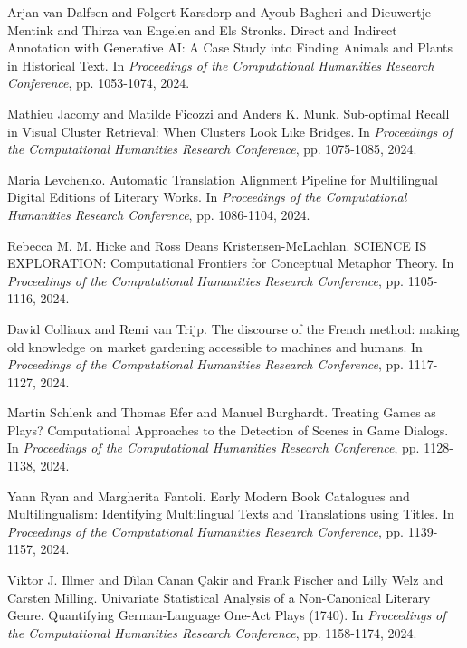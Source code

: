 \begin{thebibliography}{99}
 Arjan van Dalfsen and Folgert Karsdorp and Ayoub Bagheri and Dieuwertje Mentink and Thirza van Engelen and Els Stronks. {D}irect and {I}ndirect {A}nnotation with {G}enerative {A}I: {A} Case {S}tudy into {F}inding {A}nimals and {P}lants in {H}istorical {T}ext. In \textit{Proceedings of the Computational Humanities Research Conference}, pp. 1053-1074, 2024.

 Mathieu Jacomy and Matilde Ficozzi and Anders K. Munk. {S}ub-optimal {R}ecall in {V}isual {C}luster {R}etrieval: {W}hen {C}lusters {L}ook {L}ike {B}ridges. In \textit{Proceedings of the Computational Humanities Research Conference}, pp. 1075-1085, 2024.

 Maria Levchenko. {A}utomatic {T}ranslation {A}lignment {P}ipeline for {M}ultilingual {D}igital {E}ditions of {L}iterary {W}orks. In \textit{Proceedings of the Computational Humanities Research Conference}, pp. 1086-1104, 2024.

 Rebecca M. M. Hicke and Ross Deans Kristensen-McLachlan. S{C}IE{N}CE {I}S {E}XP{L}OR{A}TI{O}N: {C}omputational {F}rontiers for {C}onceptual {M}etaphor {T}heory. In \textit{Proceedings of the Computational Humanities Research Conference}, pp. 1105-1116, 2024.

 David Colliaux and Remi van Trijp. {T}he discourse of the {F}rench method: making old knowledge on market gardening accessible to machines and humans. In \textit{Proceedings of the Computational Humanities Research Conference}, pp. 1117-1127, 2024.

 Martin Schlenk and Thomas Efer and Manuel Burghardt. {T}reating {G}ames as {P}lays? {C}omputational {A}pproaches to the {D}etection of {S}cenes in {G}ame {D}ialogs. In \textit{Proceedings of the Computational Humanities Research Conference}, pp. 1128-1138, 2024.

 Yann Ryan and Margherita Fantoli. {E}arly {M}odern {B}ook {C}atalogues and {M}ultilingualism: {I}dentifying {M}ultilingual {T}exts and {T}ranslations using {T}itles. In \textit{Proceedings of the Computational Humanities Research Conference}, pp. 1139-1157, 2024.

 Viktor J. Illmer and D{\^\i}lan Canan {\c C}akir and Frank Fischer and Lilly Welz and Carsten Milling. {U}nivariate {S}tatistical {A}nalysis of a {N}on-{C}anonical {L}iterary {G}enre. {Q}uantifying {G}erman-{L}anguage {O}ne-{A}ct {P}lays (1740). In \textit{Proceedings of the Computational Humanities Research Conference}, pp. 1158-1174, 2024.


\end{thebibliography}
